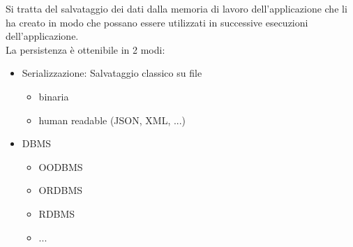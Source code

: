 Si tratta del salvataggio dei dati dalla memoria di lavoro dell'applicazione che li ha creato in modo che possano essere utilizzati in successive esecuzioni dell'applicazione.\\
La persistenza \`e ottenibile in 2 modi:
\begin{itemize}
    \item Serializzazione: Salvataggio classico su file
    \begin{itemize}
        \item binaria
        \item human readable (JSON, XML, ...)
    \end{itemize}
    
    \item DBMS
    \begin{itemize}
        \item OODBMS
        \item ORDBMS
        \item RDBMS
        \item ...
    \end{itemize}
\end{itemize}